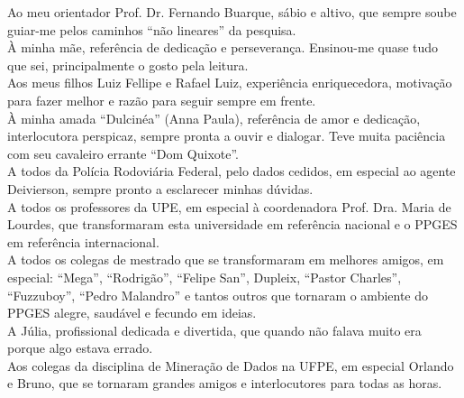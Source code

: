 Ao meu orientador Prof. Dr. Fernando Buarque, sábio e altivo, que sempre soube guiar-me pelos caminhos ``não lineares''  da pesquisa.\\

À minha mãe, referência de dedicação e perseverança. Ensinou-me quase tudo que sei, principalmente o gosto pela leitura.\\

Aos meus filhos Luiz Fellipe e Rafael Luiz, experiência enriquecedora, motivação para fazer melhor e razão para seguir sempre em frente.\\

À minha amada ``Dulcinéa'' (Anna Paula), referência de amor e dedicação, interlocutora perspicaz, sempre pronta a ouvir e dialogar. Teve muita paciência com seu cavaleiro errante ``Dom Quixote''.\\

A todos da Polícia Rodoviária Federal, pelo dados cedidos, em especial ao agente Deivierson,  sempre pronto a esclarecer minhas dúvidas.\\

A todos os professores da UPE, em especial à coordenadora Prof. Dra. Maria de Lourdes, que transformaram esta universidade em referência nacional e o PPGES em referência internacional.\\

A todos os colegas de mestrado que se transformaram em melhores amigos, em especial: ``Mega'', ``Rodrigão'', ``Felipe San'', Dupleix, ``Pastor Charles'', ``Fuzzuboy'', ``Pedro Malandro'' e tantos outros que tornaram o ambiente do PPGES alegre, saudável e fecundo em ideias.\\

A Júlia, profissional dedicada e divertida, que quando não falava muito era porque algo estava errado.\\

Aos colegas da disciplina de Mineração de Dados na UFPE, em especial Orlando e Bruno, que se tornaram grandes amigos e interlocutores para todas as horas.

